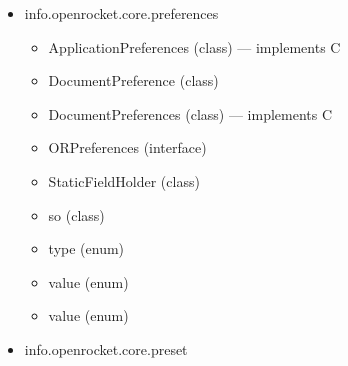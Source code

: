 \documentclass{amsdtx}
\begin{document}
\begin{itemize}
\begin{itemize}
\begin{itemize}
    \item
      AnnotationFinder (interface)
    \item
      AnnotationFinderImpl (class) --- implements A
    \item
      CustomRemapper (class) --- extends R
    \item
      JarMigrationException (class) --- extends E
    \item
      JarMigrationHelper (class)
    \item
      Plugin (interface)
    \item
      PluginHelper (class)
    \item
      PluginModule (class) --- extends A
    \item
      and (interface)
    \item
      belongs (class)
    \item
      belongs (class)
    \item
      exists (class)
    \item
      files (class)
    \item
      for (class)
    \item
      path (class)
    \item
      path (class)
    \item
      resource (class)
    \end{itemize}
  \item
    info.openrocket.core.preferences

    \begin{itemize}
    
    \item
      ApplicationPreferences (class) --- implements C
    \item
      DocumentPreference (class)
    \item
      DocumentPreferences (class) --- implements C
    \item
      ORPreferences (interface)
    \item
      StaticFieldHolder (class)
    \item
      so (class)
    \item
      type (enum)
    \item
      value (enum)
    \item
      value (enum)
    \end{itemize}
  \item
    info.openrocket.core.preset

    \begin{itemize}
    

\end{itemize}
\end{itemize}
\end{itemize}
\end{document}
